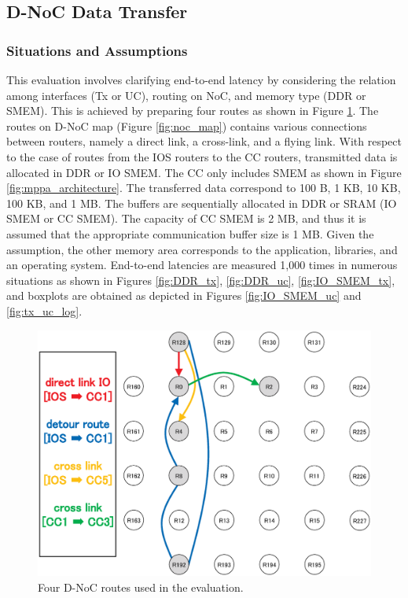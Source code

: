 \documentclass[conference,compsoc]{IEEEtran}
\begin{document}
\vspace{-3mm}
\subsection{D-NoC Data Transfer}
\label{sec:dnoc_eval}

\vspace{-3mm}
\subsubsection{Situations and Assumptions}
\label{sec:situations_and_assumptions}

This evaluation involves clarifying end-to-end latency by considering the relation among interfaces (Tx or UC), routing on NoC, and memory type (DDR or SMEM).
This is achieved by preparing four routes as shown in Figure \ref{fig:noc_routes}.
The routes on D-NoC map (Figure \ref{fig:noc_map}) contains various connections between routers, namely a direct link, a cross-link, and a flying link.
With respect to the case of routes from the IOS routers to the CC routers, transmitted data is allocated in DDR or IO SMEM.
The CC only includes SMEM as shown in Figure \ref{fig:mppa_architecture}.
The transferred data correspond to 100 B, 1 KB, 10 KB, 100 KB, and 1 MB.
The buffers are sequentially allocated in DDR or SRAM (IO SMEM or CC SMEM).
The capacity of CC SMEM is 2 MB, and thus it is assumed that the appropriate communication buffer size is 1 MB.
Given the assumption, the other memory area corresponds to the application, libraries, and an operating system.
End-to-end latencies are measured 1,000 times in numerous situations as shown in Figures \ref{fig:DDR_tx}, \ref{fig:DDR_uc}, \ref{fig:IO_SMEM_tx}, and boxplots are obtained as depicted in Figures \ref{fig:IO_SMEM_uc} and \ref{fig:tx_uc_log}.

\begin{figure}[t]
  \centering
  \includegraphics[width=0.8\linewidth]{../figure/noc_routes.eps}
  \vspace{-3mm}
  \caption{\label{fig:noc_routes}
    Four D-NoC routes used in the evaluation.}
  \vspace{-5mm}
\end{figure}
\end{document}
